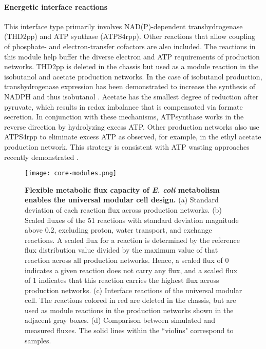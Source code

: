 \paragraph{Energetic interface reactions}
This interface type primarily involves NAD(P)-dependent transhydrogenase (THD2pp) and ATP synthase (ATPS4rpp). Other reactions that allow coupling of phosphate- and electron-transfer cofactors are also included. The reactions in this module help buffer the diverse electron and ATP requirements of production networks. THD2pp is deleted in the chassis but used as a module reaction in the isobutanol and acetate production networks.
In the case of isobutanol production, transhydrogenase expression has been demonstrated to increase the synthesis of NADPH and thus isobutanol \citep{shi2013}.
Acetate has the smallest degree of reduction after pyruvate, which results in redox imbalance that is compensated via formate secretion. In conjunction with these mechanisms, ATPsynthase works in the reverse direction by hydrolyzing excess ATP. Other production networks also use ATPS4rpp to eliminate excess ATP as observed, for example, in the ethyl acetate production network. This strategy is consistent with ATP wasting approaches recently demonstrated \citep{hadicke2015}.

%
\begin{figure}[!hp]
    \centering
    \texttt{[image: core-modules.png]}
    \caption[Flexible metabolic flux capacity of \textit{E. coli} metabolism enables the universal modular cell design]{\textbf{Flexible metabolic flux capacity of \textit{E. coli} metabolism enables the universal modular cell design.} (a) Standard deviation of each reaction flux  across production networks. (b) Scaled fluxes of the 51 reactions with standard deviation magnitude above 0.2,  excluding proton, water transport, and exchange reactions. A scaled flux for a reaction is determined by the reference flux distribution value divided by the maximum value of that reaction across all production networks. Hence, a scaled flux of 0 indicates a given reaction does not carry any flux, and a scaled flux of 1 indicates that this reaction carries the highest flux across production networks.  (c) Interface reactions of the universal modular cell.  The reactions colored in red are deleted in the chassis, but are used as module reactions in the production networks shown in the adjacent gray boxes.  (d) Comparison between simulated and measured fluxes. The solid lines within the ``violins" correspond to samples.
    }
    \label{fig5:core-modules}
\end{figure}

